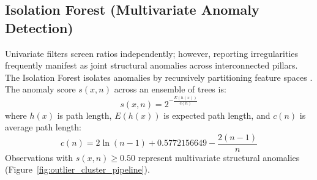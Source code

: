 \subsection{Isolation Forest (Multivariate Anomaly Detection)}
Univariate filters screen ratios independently; however, reporting irregularities frequently manifest as joint structural anomalies across interconnected pillars. The Isolation Forest isolates anomalies by recursively partitioning feature spaces \cite{liu2008isolation}. The anomaly score $s(x, n)$ across an ensemble of trees is:
\begin{equation}
    s(x, n) = 2^{-\frac{E(h(x))}{c(n)}}
\end{equation}
where $h(x)$ is path length, $E(h(x))$ is expected path length, and $c(n)$ is average path length:
\begin{equation}
    c(n) = 2\ln(n - 1) + 0.5772156649 - \frac{2(n - 1)}{n}
\end{equation}
Observations with $s(x, n) \ge 0.50$ represent multivariate structural anomalies (Figure~\ref{fig:outlier_cluster_pipeline}).

